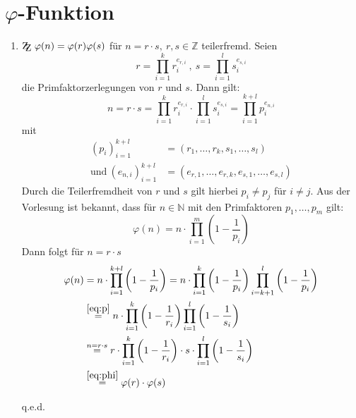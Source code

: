 \documentclass[DIN, pagenumber=false, fontsize=11pt, parskip=half]{scrartcl}
\newcommand{\Z}[0]{\mathbb{Z}}
\newcommand{\N}[0]{\mathbb{N}}
\newcommand{\ZZ}{\mathrm{Z\kern-.3em\raise-0.5ex\hbox{Z}}}
\begin{document}
    \section{$\varphi$-Funktion}
    \begin{enumerate}[label=\alph*)]
        \item $\ZZ \ \varphi(n) = \varphi(r) \varphi(s)$ für $n = r \cdot s, \ r, s \in \Z$ teilerfremd.
        Seien
        \begin{equation*}
            r = \prod_{i=1}^k{r_i^{e_{r,i}}} \ , \ s = \prod_{i=1}^l{s_i^{e_{s,i}}}
        \end{equation*}
        die Primfaktorzerlegungen von $r$ und $s$. Dann gilt:
        \begin{equation*}
            n = r \cdot s = \prod_{i=1}^k{r_i^{e_{r,i}}} \cdot \prod_{i=1}^l{s_i^{e_{s,i}}} = \prod_{i=1}^{k+l}{p_i^{e_{n, i}}}
        \end{equation*}
        mit 
        \begin{align}
            (p_i)_{i=1}^{k+l} &= (r_1, \dots, r_k, s_1, \dots, s_l) \label{eq:p}\\
            \text{und} \ (e_{n,i})_{i=1}^{k+l} &= (e_{r, 1}, \dots, e_{r, k}, e_{s, 1}, \dots, e_{s, l})
        \end{align}
        Durch die Teilerfremdheit von $r$ und $s$ gilt hierbei $p_i \neq p_j$ für $i \neq j$.
        Aus der Vorlesung ist bekannt, dass für $n \in \N$ mit den Primfaktoren $p_1, \dots, p_m$ gilt:
        \begin{equation}
            \varphi(n) = n \cdot \prod_{i=1}^m{\left(1 - \frac{1}{p_i}\right)}
            \label{eq:phi}
        \end{equation}
        Dann folgt für $n = r \cdot s$
        \begin{align*}
            \varphi(n) &= n \cdot \prod_{i = 1}^{k+l}{\left(1 - \frac{1}{p_i}\right)} =
            n \cdot \prod_{i=1}^k{\left(1 - \frac{1}{p_i}\right)} \prod_{i=k+1}^l{\left(1 - \frac{1}{p_i}\right)} \\
            &\stackrel{\ref{eq:p}}{=} n \cdot \prod_{i=1}^k{\left(1 - \frac{1}{r_i}\right)} \prod_{i=1}^l{\left(1 - \frac{1}{s_i}\right)} \\
            & \stackrel{n=r \cdot s}{=} r \cdot \prod_{i=1}^k{\left(1 - \frac{1}{r_i}\right)} \cdot s \cdot \prod_{i=1}^l{\left(1 - \frac{1}{s_i}\right)} \\
            &\stackrel{\ref{eq:phi}}{=} \varphi(r) \cdot \varphi(s)
        \end{align*}
        \begin{flushright}
            q.e.d.
        \end{flushright}


\end{enumerate}
\end{document}

